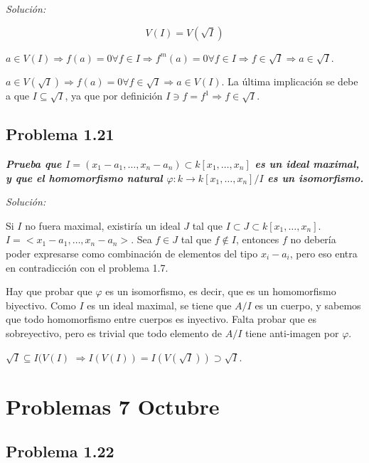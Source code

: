 \textit{Solución: }
\vspace{2mm}

$$V(I)=V(\sqrt{I})$$

\framebox{$\subseteq$} $a\in V(I) \Rightarrow f(a)=0  \forall f \in I \Rightarrow f^m(a)=0 \forall f \in I \Rightarrow f\in \sqrt{I} \Rightarrow a\in \sqrt{I}$.

\framebox{$\supseteq $} $a\in V(\sqrt{I}) \Rightarrow f(a)= 0 \forall f\in \sqrt{I} \Rightarrow a\in V(I)$. La última implicación se debe a que $I\subseteq \sqrt{I}$, ya que por definición $I\ni f = f^1 \Rightarrow f\in \sqrt{I}$.

\subsection{Problema 1.21}

\textbf{\textit{Prueba que $I=(x_1-a_1,\dots ,x_n-a_n)\subset k[x_1,\dots,x_n]$ es un ideal maximal, y que el homomorfismo natural $\varphi: k \rightarrow k[x_1,\dots,x_n]/I$ es un isomorfismo.}}

\textit{Solución: }
\vspace{2mm}

Si $I$ no fuera maximal, existiría un ideal $J$ tal que $I\subset J \subset k[x_1,\dots ,x_n]$. $I=<x_1-a_1,\dots ,x_n-a_n>$. Sea $f\in J$ tal que $f\notin I$, entonces $f$ no debería poder expresarse como combinación de elementos del tipo $x_i-a_i$, pero eso entra en contradicción con el problema 1.7.

Hay que probar que $\varphi $ es un isomorfismo, es decir, que es un homomorfismo biyectivo. Como $I$ es un ideal maximal, se tiene que $A/I$ es un cuerpo, y sabemos que todo homomorfismo entre cuerpos es inyectivo. Falta probar que es sobreyectivo, pero es trivial que todo elemento de $A/I$ tiene anti-imagen por $\varphi $.

$\sqrt{I}\subseteq I(V(I)$ $\Rightarrow I(V(I))=I(V(\sqrt{I}))\supset \sqrt{I}$.

\section{Problemas 7 Octubre}

\subsection{Problema 1.22}

